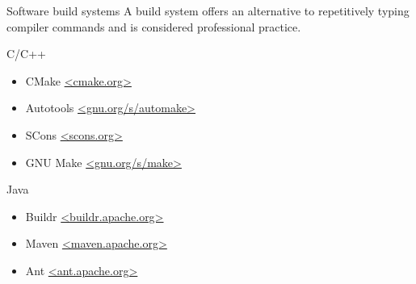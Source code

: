 \begin{block}{Software build systems}
  A build system offers an alternative to repetitively typing compiler commands and is considered professional practice.
  \begin{indented_itemize}
  \item C/C++
    \begin{itemize}
    \item CMake \url{<cmake.org>}
    \item Autotools \url{<gnu.org/s/automake>}
    \item SCons \url{<scons.org>}
    \item GNU Make \url{<gnu.org/s/make>}
    \end{itemize}
  \item Java
    \begin{itemize}
    \item Buildr \url{<buildr.apache.org>}
    \item Maven \url{<maven.apache.org>}
    \item Ant \url{<ant.apache.org>}
    \end{itemize}
  \end{indented_itemize}
\end{block}
